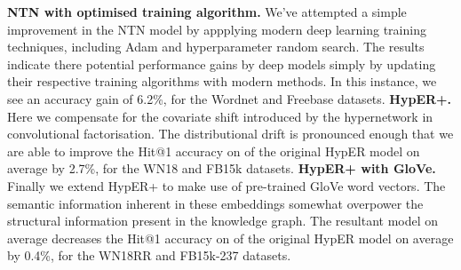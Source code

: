 \textbf{NTN with optimised training algorithm.} We've attempted a simple improvement in the NTN model by appplying modern deep learning training techniques, including Adam and hyperparameter random search. The results indicate there potential performance gains by deep models simply by updating their respective training algorithms with modern methods. In this instance, we see an accuracy gain of 6.2\%, for the Wordnet and Freebase datasets. \newline
\noindent \textbf{HypER+.}  Here we compensate for the covariate shift introduced by the hypernetwork in convolutional factorisation. The distributional drift is pronounced enough that we are able to improve the Hit@1 accuracy on of the original HypER model on average by 2.7\%, for the WN18 and FB15k datasets.\newline
\noindent \textbf{HypER+ with GloVe.} Finally we extend HypER+ to make use of pre-trained GloVe word vectors. The semantic information inherent in these embeddings somewhat overpower the structural information present in the knowledge graph. The resultant model on average decreases the Hit@1 accuracy on of the original HypER model on average by 0.4\%, for the WN18RR and FB15k-237 datasets. \newline
